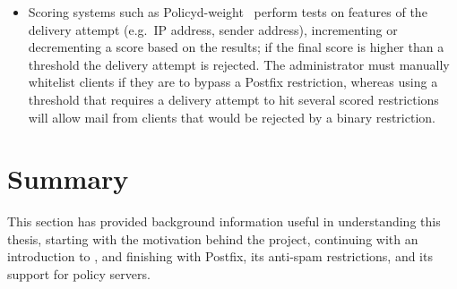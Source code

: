 \begin{itemize}

    \item Scoring systems such as Policyd-weight~\cite{policyd-weight}
        perform tests on features of the delivery attempt (e.g.\ IP
        address, sender address), incrementing or decrementing a score
        based on the results; if the final score is higher than a threshold
        the delivery attempt is rejected.  The administrator must manually
        whitelist clients if they are to bypass a Postfix restriction,
        whereas using a threshold that requires a delivery attempt to hit
        several scored restrictions will allow mail from clients that would
        be rejected by a binary restriction.

\end{itemize}

\section{Summary}

This section has provided background information useful in understanding
this thesis, starting with the motivation behind the project, continuing
with an introduction to , and finishing with Postfix, its
anti-spam restrictions, and its support for policy servers.
